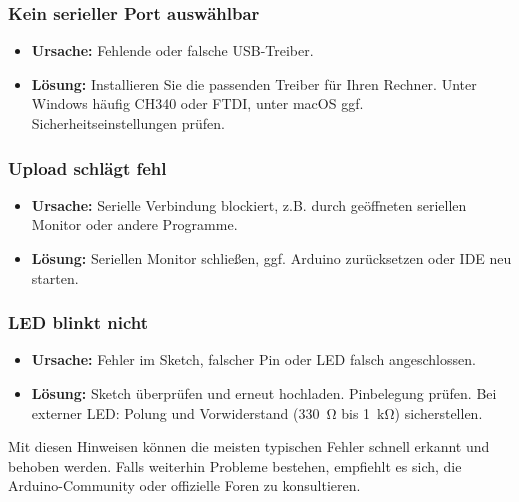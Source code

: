 \subsubsection{Kein serieller Port auswählbar}

\begin{itemize}
	\item \textbf{Ursache:} Fehlende oder falsche USB-Treiber.
	\item \textbf{Lösung:} Installieren Sie die passenden Treiber für Ihren Rechner. Unter Windows häufig CH340 oder FTDI, unter macOS ggf. Sicherheitseinstellungen prüfen.
\end{itemize}

\subsubsection{Upload schlägt fehl}

\begin{itemize}
	\item \textbf{Ursache:} Serielle Verbindung blockiert, z.B. durch geöffneten seriellen Monitor oder andere Programme.
	\item \textbf{Lösung:} Seriellen Monitor schließen, ggf. Arduino zurücksetzen oder IDE neu starten.
\end{itemize}

\subsubsection{LED blinkt nicht}

\begin{itemize}
	\item \textbf{Ursache:} Fehler im Sketch, falscher Pin oder LED falsch angeschlossen.
	\item \textbf{Lösung:} Sketch überprüfen und erneut hochladen. Pinbelegung prüfen. Bei externer LED: Polung und Vorwiderstand (\SI{330}{\ohm} bis \SI{1}{\kilo\ohm}) sicherstellen.
\end{itemize}

\vspace{1em}

Mit diesen Hinweisen können die meisten typischen Fehler schnell erkannt und behoben werden. Falls weiterhin Probleme bestehen, empfiehlt es sich, die Arduino-Community oder offizielle Foren zu konsultieren.

